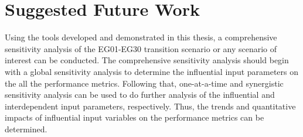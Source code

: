 \section{Suggested Future Work}
Using the tools developed and demonstrated in this thesis, a comprehensive 
sensitivity analysis of the EG01-EG30 transition scenario or any scenario of interest 
can be conducted. 
The comprehensive sensitivity analysis should begin with a global
sensitivity analysis to determine the influential input parameters 
on the all the performance metrics. 
Following that, one-at-a-time and synergistic sensitivity analysis can be used to do 
further analysis of the influential and interdependent input parameters, respectively. 
Thus, the trends and quantitative impacts of influential input variables on the performance 
metrics can be determined.  